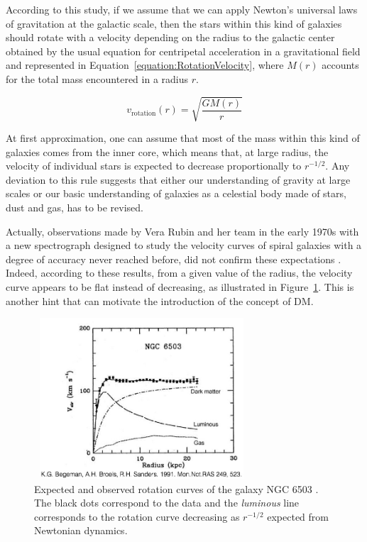 \documentclass[a4paper, 10pt, openright]{report}
\begin{document}
According to this study, if we assume that we can apply Newton's universal laws of gravitation at the galactic scale, then the stars within this kind of galaxies should rotate with a velocity depending on the radius to the galactic center obtained by the usual equation for centripetal acceleration in a gravitational field and represented in Equation~\ref{equation:RotationVelocity}, where $M(r)$ accounts for the total mass encountered in a radius $r$.

\begin{equation} \label{equation:RotationVelocity}
v_{\text{rotation}}(r) = \sqrt{\frac{G M(r)}{r}}
\end{equation}

At first approximation, one can assume that most of the mass within this kind of galaxies comes from the inner core, which means that, at large radius, the velocity of individual stars is expected to decrease proportionally to $r^{-1/2}$. Any deviation to this rule suggests that either our understanding of gravity at large scales or our basic understanding of galaxies as a celestial body made of stars, dust and gas, has to be revised.

Actually, observations made by Vera Rubin and her team in the early 1970s with a new spectrograph designed to study the velocity curves of spiral galaxies with a degree of accuracy never reached before, did not confirm these expectations \cite{VeraRubin}. Indeed, according to these results, from a given value of the radius, the velocity curve appears to be flat instead of decreasing, as illustrated in Figure~\ref{figure:RotationCurves}. This is another hint that can motivate the introduction of the concept of \ac{DM}.

\begin{figure}[htbp]
\begin{center}
\includegraphics[width=8cm, height=6cm]{figs/RotationCurve.jpeg}
\caption{Expected and observed rotation curves of the galaxy NGC 6503 \cite{RotationCurves}. The black dots correspond to the data and the \textit{luminous} line corresponds to the rotation curve decreasing as $r^{-1/2}$ expected from Newtonian dynamics.}
\label{figure:RotationCurves}
\end{center}
\end{figure}
\end{document}
